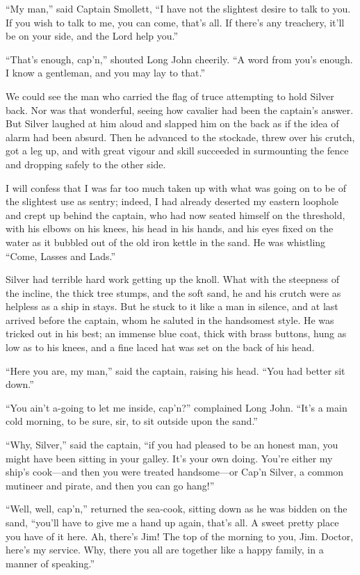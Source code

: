 \enquote{My man,} said Captain Smollett, \enquote{I have not the slightest desire to talk to you. If you wish to talk to me, you can come, that’s all. If there’s any treachery, it’ll be on your side, and the Lord help you.}

\enquote{That’s enough, cap’n,} shouted Long John cheerily. \enquote{A word from you’s enough. I know a gentleman, and you may lay to that.}

We could see the man who carried the flag of truce attempting to hold Silver back. Nor was that wonderful, seeing how cavalier had been the captain’s answer. But Silver laughed at him aloud and slapped him on the back as if the idea of alarm had been absurd. Then he advanced to the stockade, threw over his crutch, got a leg up, and with great vigour and skill succeeded in surmounting the fence and dropping safely to the other side.

I will confess that I was far too much taken up with what was going on to be of the slightest use as sentry; indeed, I had already deserted my eastern loophole and crept up behind the captain, who had now seated himself on the threshold, with his elbows on his knees, his head in his hands, and his eyes fixed on the water as it bubbled out of the old iron kettle in the sand. He was whistling \enquote{Come, Lasses and Lads.}

Silver had terrible hard work getting up the knoll. What with the steepness of the incline, the thick tree stumps, and the soft sand, he and his crutch were as helpless as a ship in stays. But he stuck to it like a man in silence, and at last arrived before the captain, whom he saluted in the handsomest style. He was tricked out in his best; an immense blue coat, thick with brass buttons, hung as low as to his knees, and a fine laced hat was set on the back of his head.

\enquote{Here you are, my man,} said the captain, raising his head. \enquote{You had better sit down.}

\enquote{You ain’t a-going to let me inside, cap’n?} complained Long John. \enquote{It’s a main cold morning, to be sure, sir, to sit outside upon the sand.}

\enquote{Why, Silver,} said the captain, \enquote{if you had pleased to be an honest man, you might have been sitting in your galley. It’s your own doing. You’re either my ship’s cook---and then you were treated handsome---or Cap’n Silver, a common mutineer and pirate, and then you can go hang!}

\enquote{Well, well, cap’n,} returned the sea-cook, sitting down as he was bidden on the sand, \enquote{you’ll have to give me a hand up again, that’s all. A sweet pretty place you have of it here. Ah, there’s Jim! The top of the morning to you, Jim. Doctor, here’s my service. Why, there you all are together like a happy family, in a manner of speaking.}

